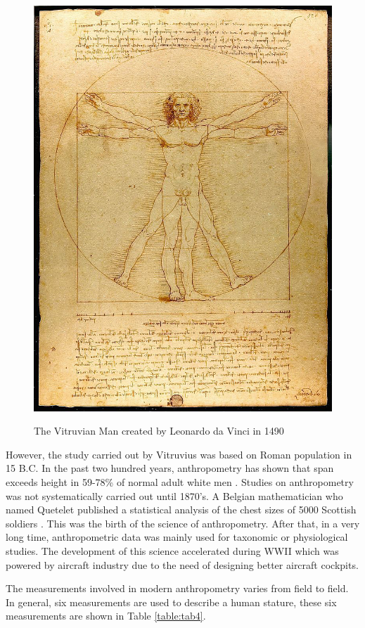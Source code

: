 \begin{figure}[H]
    \centering
	\includegraphics[width=0.48\columnwidth]{../images/Da_Vinci}\\[1cm]
    \caption[The Vitruvian Man]{The Vitruvian Man created by Leonardo da Vinci in 1490 }
    \label{figure:fig2}
\end{figure}

However, the study carried out by Vitruvius was based on Roman population in 15 B.C. In the past two hundred years, anthropometry has shown that span exceeds height in 59-78\% of normal adult white men . Studies on anthropometry was not systematically carried out until 1870's. A Belgian mathematician who named Quetelet published a statistical analysis of the chest sizes of 5000 Scottish soldiers . This was the birth of the science of anthropometry. After that, in a very long time, anthropometric data was mainly used for taxonomic or physiological studies. The development of this science accelerated during WWII which was powered by aircraft industry due to the need of designing better aircraft cockpits. 

The measurements involved in modern anthropometry varies from field to field. In general, six measurements are used to describe a human stature, these six measurements are shown in Table \ref{table:tab4}.

